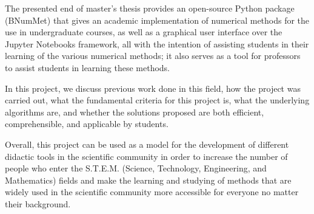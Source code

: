 \newcommand{\KeywordsAbstract}{Numerical methods, Open-source, Python, Jupyter, Software development, Linear systems, Interpolation, Nonlinear Equations, Least squares, Random number generators}

The presented end of master's thesis provides an open-source Python package (BNumMet) that gives an academic implementation of numerical methods for the use in undergraduate courses, as well as a graphical user interface over the Jupyter Notebooks framework, all with the intention of assisting students in their learning of the various numerical methods; it also serves as a tool for professors to assist students in learning these methods.


In this project, we discuss previous work done in this field, how the project was carried out, what the fundamental criteria for this project is, what the underlying algorithms are, and whether the solutions proposed are both efficient, comprehensible, and applicable by students.

Overall, this project can be used as a model for the development of different didactic tools in the scientific community in order to increase the number of people who enter the S.T.E.M. (Science, Technology, Engineering, and Mathematics) fields and make the learning and studying of methods that are widely used in the scientific community more accessible for everyone no matter their background. 